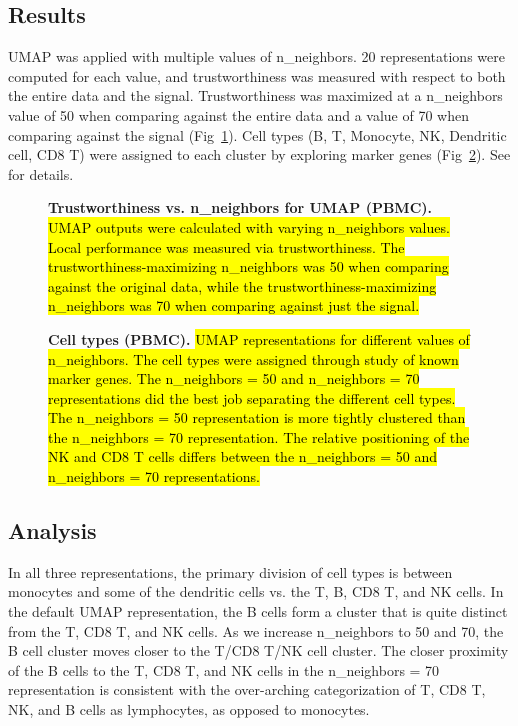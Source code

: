 \documentclass[10pt,letterpaper]{article}
\begin{document}
\subsection*{Results}
UMAP was applied with multiple values of n\_neighbors. 20 representations were computed for each value, and trustworthiness was measured with respect to both the entire data and the signal. Trustworthiness was maximized at a n\_neighbors value of 50 when comparing against the entire data and a value of 70 when comparing against the signal (Fig~\ref{fig16}). Cell types (B, T, Monocyte, NK, Dendritic cell, CD8 T) were assigned to each cluster by exploring marker genes (Fig~\ref{fig17}). See \cite{BPCells tutorial} for details.

\begin{figure}[!h]
\centering
\caption{{\bf Trustworthiness vs. n\_neighbors for UMAP (PBMC).}
\hl{UMAP outputs were calculated with varying n\_neighbors values. Local performance was measured via trustworthiness. The trustworthiness-maximizing n\_neighbors was 50 when comparing against the original data, while the trustworthiness-maximizing n\_neighbors was 70 when comparing against just the signal.}}
\label{fig16}
\end{figure}

\begin{figure}[!h]
\caption{{\bf Cell types (PBMC).}
\hl{UMAP representations for different values of n\_neighbors. The cell types were assigned through study of known marker genes. The n\_neighbors = 50 and n\_neighbors = 70 representations did the best job separating the different cell types. The n\_neighbors = 50 representation is more tightly clustered than the n\_neighbors = 70 representation. The relative positioning of the NK and CD8 T cells differs between the n\_neighbors = 50 and n\_neighbors = 70 representations.}}
\label{fig17}
\end{figure}

\subsection*{Analysis}
In all three representations, the primary division of cell types is between monocytes and some of the dendritic cells vs. the T, B, CD8 T, and NK cells. In the default UMAP representation, the B cells form a cluster that is quite distinct from the T, CD8 T, and NK cells. As we increase n\_neighbors to 50 and 70, the B cell cluster moves closer to the T/CD8 T/NK cell cluster. The closer proximity of the B cells to the T, CD8 T, and NK cells in the n\_neighbors = 70 representation is consistent with the over-arching categorization of T, CD8 T, NK, and B cells as lymphocytes, as opposed to monocytes.
\end{document}
